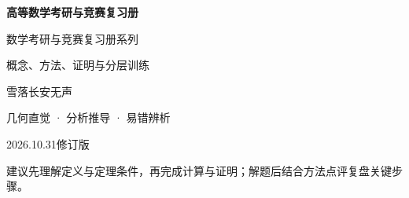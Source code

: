 \thispagestyle{empty}\vspace*{32mm}
\begin{center}
{\LARGE\bfseries 高等数学考研与竞赛复习册}\par\vspace{15mm}
数学考研与竞赛复习册系列\par
概念、方法、证明与分层训练\par\vspace{22mm}
{\large 雪落长安无声}\par\vspace{6mm}
\vspace{12mm}
几何直觉 · 分析推导 · 易错辨析\par\vspace{12mm}
2026.10.31\quad 修订版
\end{center}\vfill
建议先理解定义与定理条件，再完成计算与证明；解题后结合方法点评复盘关键步骤。
